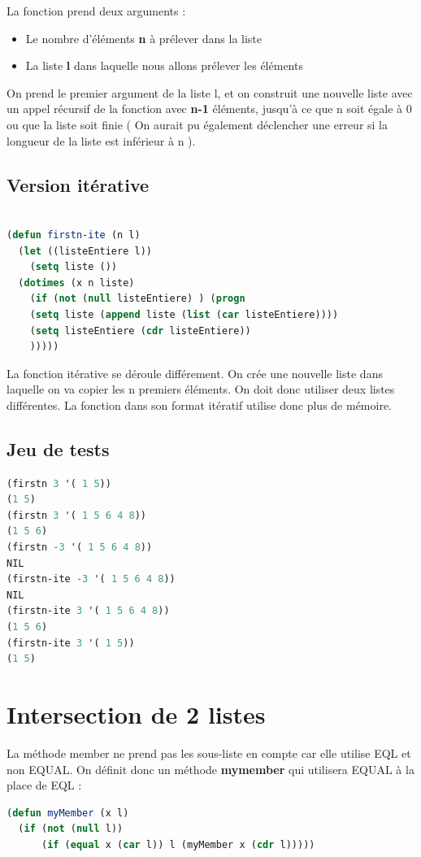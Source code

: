 \documentclass[a4paper,10pt]{report}
\begin{document}
  La fonction prend deux arguments :
  \begin{itemize}
   \item Le nombre d'éléments \textbf{n} à prélever dans la liste
   \item La liste \textbf{l} dans laquelle nous allons prélever les éléments
  \end{itemize}
  On prend le premier argument de la liste l, et on construit une nouvelle liste avec un appel récursif de la fonction avec \textbf{n-1} éléments, 
  jusqu'à ce que n soit égale à 0 ou que la liste soit finie ( On aurait pu également déclencher une erreur si la longueur de la liste est inférieur à n ). \newline
    \subsection{Version itérative}
  \begin{lstlisting}[language=Lisp]
    
(defun firstn-ite (n l)
  (let ((listeEntiere l))
    (setq liste ())
  (dotimes (x n liste)
    (if (not (null listeEntiere) ) (progn 
    (setq liste (append liste (list (car listeEntiere))))
    (setq listeEntiere (cdr listeEntiere))
    )))))

  \end{lstlisting}
  
  La fonction itérative se déroule différement. On crée une nouvelle liste dans laquelle on va copier les n premiers éléments. 
  On doit donc utiliser deux listes différentes. La fonction dans son format itératif utilise donc plus de mémoire. 
  
	  \subsection{Jeu de tests}
	  	\begin{lstlisting}[language=Lisp]
(firstn 3 '( 1 5))
(1 5)
(firstn 3 '( 1 5 6 4 8))
(1 5 6)
(firstn -3 '( 1 5 6 4 8))
NIL
(firstn-ite -3 '( 1 5 6 4 8))
NIL
(firstn-ite 3 '( 1 5 6 4 8))
(1 5 6)
(firstn-ite 3 '( 1 5))
(1 5)
		 \end{lstlisting}

    \newpage
    \section{Intersection de 2 listes}
    
    La méthode member ne prend pas les sous-liste en compte car elle utilise EQL et non EQUAL. On définit donc un méthode \textbf{mymember} qui utilisera EQUAL à la place de EQL :
\begin{lstlisting}[language=Lisp]
(defun myMember (x l)
  (if (not (null l))
      (if (equal x (car l)) l (myMember x (cdr l)))))
\end{lstlisting}
    
\end{document}

